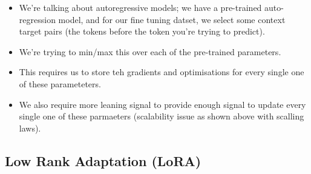\documentclass[11pt]{article}
\begin{document}
\begin{minipage}[l]{.5\linewidth}
    \begin{figure}[H]
        \centering
    \end{figure}    
\end{minipage}\hfill
\begin{minipage}[r]{.48\linewidth}
    \begin{itemize}
        \item We're talking about autoregressive models; we have a pre-trained auto-regression model, and for our fine tuning datset, we select some context target pairs (the tokens before the token you're trying to predict).
        \item We're trying to min/max this over each of the pre-trained parameters. 
        \item This requires us to store teh gradients and optimisations for every single one of these parameteters.
        \item We also require more leaning signal to provide enough signal to update every single one of these parmaeters (scalability issue as shown above with scalling laws).
    \end{itemize}
\end{minipage}

\subsection{Low Rank Adaptation (LoRA)}
\end{document}
